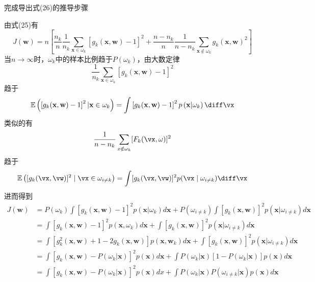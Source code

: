 \documentclass[reportComp]{thesis}
\begin{document}
\begin{question}[\textsection 6 Q17]
完成导出式(26)的推导步骤
\end{question}
\begin{answer}
由式(25)有
\[J(\mathbf{w})=n\left[\frac{n_{k}}{n} \frac{1}{n_{k}} \sum_{\mathbf{x} \in \omega_{k}}\left[g_{k}(\mathbf{x}, \mathbf{w})-1\right]^{2}+\frac{n-n_{k}}{n} \frac{1}{n-n_{k}} \sum_{\mathbf{x} \notin\omega_{k}} g_{k}(\mathbf{x}, \mathbf{w})^{2}\right]\]
当$n\to\infty$时，$\omega_k$中的样本比例趋于$P(\omega_k)$，由大数定律
\[\frac{1}{n_{k}} \sum_{\mathbf{x} \in \omega_{k}}\left[g_{k}(\mathbf{x}, \mathbf{w})-1\right]^{2}\]
趋于
\[\mathbb{E}\left(\left[g_{k}(\mathbf{x}, \mathbf{w})-1\right]^{2} | \mathbf{x} \in \omega_{k}\right)=
\int\left[g_{k}(\mathbf{x}, \mathbf{w})-1\right]^{2} p\left(\mathbf{x} | \omega_{k}\right) \diff \vx\]
类似的有
\[\frac{1}{n-n_k}\sum_{x\notin \omega_k}[F_k(\vx,\omega)]^2\]
趋于
\[\mathbb{E}\left([g_k(\vx,\vw)]^2\mid\vx\in\omega_{i\ne k}\right)
=\int[g_k(\vx,\vw)]^2p(\vx\mid\omega_{i\ne k})\diff\vx\]
进而得到
\[\begin{aligned}
J(\mathbf{w}) &=P\left(\omega_{k}\right) \int\left[g_{k}(\mathbf{x}, \mathbf{w})-1\right]^{2} p\left(\mathbf{x} | \omega_{k}\right) d \mathbf{x}+P\left(\omega_{i \neq k}\right) \int\left[g_{k}(\mathbf{x}, \mathbf{w})\right]^{2} p\left(\mathbf{x} | \omega_{i \neq k}\right) d \mathbf{x} \\
&=\int\left[g_{k}(\mathbf{x}, \mathbf{w})-1\right]^{2} p\left(\mathbf{x}, \omega_{k}\right) d \mathbf{x}+\int\left[g_{k}(\mathbf{x}, \mathbf{w})\right]^{2} p\left(\mathbf{x} | \omega_{i \neq k}\right) d \mathbf{x} \\
&=\int\left[g_{k}^{2}(\mathbf{x}, \mathbf{w})+1-2 g_{k}(\mathbf{x}, \mathbf{w})\right] p\left(\mathbf{x}, \mathbf{w}_{k}\right) d \mathbf{x}+\int\left[g_{k}(\mathbf{x}, \mathbf{w})\right]^{2} p\left(\mathbf{x} | \omega_{i \neq k}\right) d \mathbf{x} \\
&=\int\left[g_{k}(\mathbf{x}, \mathbf{w})-P\left(\omega_{k} | \mathbf{x}\right)\right]^{2} p(\mathbf{x}) d \mathbf{x}+\int P\left(\omega_{k} | \mathbf{x}\right)\left[1-P\left(\omega_{k} | \mathbf{x}\right)\right] p(\mathbf{x}) d \mathbf{x} \\
&=\int\left[g_{k}(\mathbf{x}, \mathbf{w})-P\left(\omega_{k} | \mathbf{x}\right)\right]^{2} p(\mathbf{x}) d x+\int P\left(\omega_{k} | \mathbf{x}\right) P\left(\omega_{i \neq k} | \mathbf{x}\right) p(\mathbf{x}) d \mathbf{x}
\end{aligned}\]
\end{answer}
\end{document}
